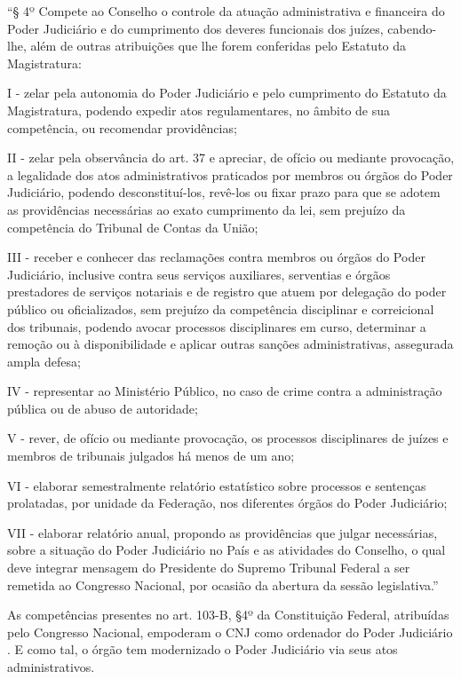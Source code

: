 \noindent
\begin{flushleft}
	\setlength{\leftskip}{4cm}
	\small
	“§ 4º Compete ao Conselho o controle da atuação administrativa e financeira do Poder Judiciário e do cumprimento dos deveres funcionais dos juízes, cabendo-lhe, além de outras atribuições que lhe forem conferidas pelo Estatuto da Magistratura:
	
	I - zelar pela autonomia do Poder Judiciário e pelo cumprimento do Estatuto da Magistratura, podendo expedir atos regulamentares, no âmbito de sua competência, ou recomendar providências;
	
	II - zelar pela observância do art. 37 e apreciar, de ofício ou mediante provocação, a legalidade dos atos administrativos praticados por membros ou órgãos do Poder Judiciário, podendo desconstituí-los, revê-los ou fixar prazo para que se adotem as providências necessárias ao exato cumprimento da lei, sem prejuízo da competência do Tribunal de Contas da União;
	
	III - receber e conhecer das reclamações contra membros ou órgãos do Poder Judiciário, inclusive contra seus serviços auxiliares, serventias e órgãos prestadores de serviços notariais e de registro que atuem por delegação do poder público ou oficializados, sem prejuízo da competência disciplinar e correicional dos tribunais, podendo avocar processos disciplinares em curso, determinar a remoção ou à disponibilidade e aplicar outras sanções administrativas, assegurada ampla defesa;
	
	IV - representar ao Ministério Público, no caso de crime contra a administração pública ou de abuso de autoridade;
	
	V - rever, de ofício ou mediante provocação, os processos disciplinares de juízes e membros de tribunais julgados há menos de um ano;
	
	VI - elaborar semestralmente relatório estatístico sobre processos e sentenças prolatadas, por unidade da Federação, nos diferentes órgãos do Poder Judiciário;
	
	VII - elaborar relatório anual, propondo as providências que julgar necessárias, sobre a situação do Poder Judiciário no País e as atividades do Conselho, o qual deve integrar mensagem do Presidente do Supremo Tribunal Federal a ser remetida ao Congresso Nacional, por ocasião da abertura da sessão legislativa.”
\end{flushleft}      

As competências presentes no art. 103-B, §4º da Constituição Federal, atribuídas pelo Congresso Nacional, empoderam o CNJ como ordenador do Poder Judiciário . E como tal, o órgão tem modernizado o Poder Judiciário via seus atos administrativos. 

